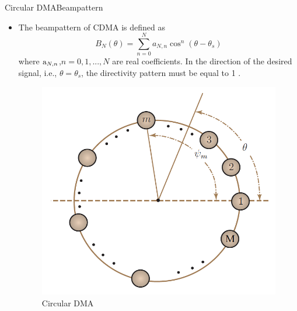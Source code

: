 \documentclass{beamer}
\begin{document}
\begin{frame}{Circular DMA}{Beampattern}
\begin{itemize}
\item{
The beampattern of CDMA is defined as 
\begin{equation}
\label{eq:CDMA}
{{B}_{N}}(\theta )=\sum\limits_{n=0}^{N}{{{a}_{N,n}}{{\cos }^{n}}(\theta -{{\theta }_{s}})}
\end{equation}
where $ {{\rm{a}}_{N,n}} $,$ n=0,1,...,N$ are real coefficients. In the direction of the desired signal, i.e., $\theta ={{\theta }_{s}}$, the directivity pattern must be equal to 1 \cite{7}.
}

\begin{figure}[ht]
		\includegraphics[scale=0.25]{3.png}
		\caption{Circular DMA} 
		\label{Circular DMA}	
	\end{figure}
\end{itemize}
	
\end{frame}
\end{document}
